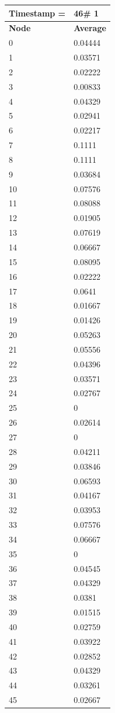 \begin{tabular}{|l||l|}
\hline
\textbf{Timestamp =} & \textbf{46}\# 1\\\hline
	\textbf{Node} & \textbf{Average} \\ \hline
\hline
	0 & 0.04444 \\ \hline
	1 & 0.03571 \\ \hline
	2 & 0.02222 \\ \hline
	3 & 0.00833 \\ \hline
	4 & 0.04329 \\ \hline
	5 & 0.02941 \\ \hline
	6 & 0.02217 \\ \hline
	7 & 0.1111 \\ \hline
	8 & 0.1111 \\ \hline
	9 & 0.03684 \\ \hline
	10 & 0.07576 \\ \hline
	11 & 0.08088 \\ \hline
	12 & 0.01905 \\ \hline
	13 & 0.07619 \\ \hline
	14 & 0.06667 \\ \hline
	15 & 0.08095 \\ \hline
	16 & 0.02222 \\ \hline
	17 & 0.0641 \\ \hline
	18 & 0.01667 \\ \hline
	19 & 0.01426 \\ \hline
	20 & 0.05263 \\ \hline
	21 & 0.05556 \\ \hline
	22 & 0.04396 \\ \hline
	23 & 0.03571 \\ \hline
	24 & 0.02767 \\ \hline
	25 & 0 \\ \hline
	26 & 0.02614 \\ \hline
	27 & 0 \\ \hline
	28 & 0.04211 \\ \hline
	29 & 0.03846 \\ \hline
	30 & 0.06593 \\ \hline
	31 & 0.04167 \\ \hline
	32 & 0.03953 \\ \hline
	33 & 0.07576 \\ \hline
	34 & 0.06667 \\ \hline
	35 & 0 \\ \hline
	36 & 0.04545 \\ \hline
	37 & 0.04329 \\ \hline
	38 & 0.0381 \\ \hline
	39 & 0.01515 \\ \hline
	40 & 0.02759 \\ \hline
	41 & 0.03922 \\ \hline
	42 & 0.02852 \\ \hline
	43 & 0.04329 \\ \hline
	44 & 0.03261 \\ \hline
	45 & 0.02667 \\ \hline
\end{tabular}
